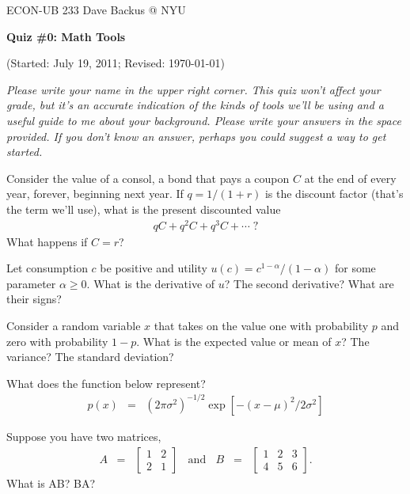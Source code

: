 \documentclass[11pt]{exam}
\begin{document}
\bigskipamount
\parindent=0.0in
\thispagestyle{empty}
{\large ECON-UB 233 \hfill Dave Backus @ NYU}

\bigskip\bigskip
\centerline{\Large \bf Quiz \#0:  Math Tools}
\centerline{(Started: July 19, 2011; Revised: \today)}

{\it Please write your name in the upper right corner.
This quiz won't affect your grade, but it's an accurate indication of the kinds of tools
we'll be using and a useful guide to me about your background.
Please write your answers in the space provided.
If you don't know an answer, perhaps you could suggest a way to get started.}

\begin{questions}
\question Consider the value of a consol,
a bond that pays a coupon $C$ at the end of every year, forever,
beginning next year.
If $q = 1/(1+r)$ is the discount factor (that's the term we'll use),
what is the present discounted value
\begin{eqnarray*}
    q C + q^2 C + q^3 C + \cdots \; ?
\end{eqnarray*}
What happens if $C=r$?

\vspace{2.5in}
\question Let consumption $c$ be positive and utility
$u(c) = c^{1-\alpha}/(1-\alpha)$ for some parameter $\alpha \geq 0$.
What is the derivative of $u$?
The second derivative?
What are their signs?

\pagebreak
\question Consider a random variable $x$ that takes on the value one with probability $p$
and zero with probability $1-p$.
What is the expected value or mean of $x$?
The variance?  The standard deviation?


\vspace{2in}
\question What does the function below represent?
\begin{eqnarray*}
    p(x) &=& (2 \pi \sigma^2)^{-1/2} \exp[ - (x-\mu)^2/2 \sigma^2]
\end{eqnarray*}

\vspace{2in}
\question Suppose you have two matrices,
\begin{eqnarray*}
A \;\;=\;\; \left[
            \begin{array}{cc}
            1 & 2 \\ 2 & 1
            \end{array}
            \right] \;\;\mbox{ and }\;\;
B \;\;=\;\; \left[
            \begin{array}{ccc}
            1 & 2 & 3 \\ 4 & 5 & 6
            \end{array}
            \right] .
\end{eqnarray*}
What is AB?  BA?
\end{questions}
\end{document}
